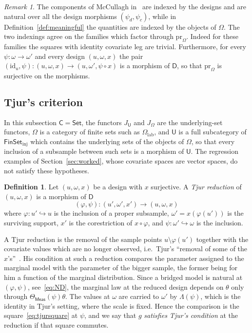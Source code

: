 \documentclass[11pt,a4paper]{article}
\theoremstyle{plain}
\theoremstyle{definition}
\newtheorem{definition}[theorem]{Definition}
\theoremstyle{remark}
\newtheorem{remark}[theorem]{Remark}
\newcommand{\cat}[1]{\mathsf{#1}}
\newcommand{\catU}{\cat{U}}
\newcommand{\catO}{\cat{\Omega}}
\newcommand{\catD}{\cat{D}}
\newcommand{\Meas}{\cat{Meas}}
\newcommand{\Set}{\cat{Set}}
\newcommand{\FinSet}{\cat{FinSet}}
\newcommand{\id}{\mathrm{id}}
\newcommand{\pr}{\mathrm{pr}}
\begin{document}
\begin{remark}\label{rem:indexings}
The components of McCullagh in~\cite[\S4.5]{mccullagh_what_2002} are indexed
by the designs and are natural over all the design morphisms
$(\psi_{d},\psi_{c})$, while in Definition~\ref{def:meaningful} the quantities
are indexed by the objects of $\catO$. The two indexings agree on the families
which factor through $\pr_{\catO}$. Indeed for these families the squares with
identity covariate leg are trivial. Furthermore, for every
$\psi \colon \omega \to \omega'$ and every design $(u,\omega,x)$ the pair
$(\id_{u},\psi) \colon (u,\omega,x) \to (u,\omega',\psi\circ x)$ is a morphism
of $\catD$, so that $\pr_{\catO}$ is surjective on the morphisms.
\end{remark}

\subsection{Tjur's criterion}\label{sec:tjur}

In this subsection $\cat{C} = \Set$, the functors $J_{\catU}$ and $J_{\catO}$
are the underlying-set functors, $\catO$ is a category of finite sets such as
$\catO_{\mathrm{lab}}$, and $\catU$ is a full subcategory of
$\FinSet_{\mathrm{inj}}$ which contains the underlying sets of the objects of
$\catO$, so that every inclusion of a subsample between such sets is a
morphism of $\catU$. The regression examples of Section~\ref{sec:worked},
whose covariate spaces are vector spaces, do not satisfy these hypotheses.

\begin{definition}\label{def:tjurreduction}
Let $(u,\omega,x)$ be a design with $x$ surjective. A \emph{Tjur reduction} of
$(u,\omega,x)$ is a morphism of $\catD$
\[
(\varphi,\psi) \colon (u',\omega',x') \longrightarrow (u,\omega,x)
\]
where $\varphi \colon u' \hookrightarrow u$ is the inclusion of a proper
subsample, $\omega' = x(\varphi(u'))$ is the surviving support, $x'$ is the
corestriction of $x \circ \varphi$, and
$\psi \colon \omega' \hookrightarrow \omega$ is the inclusion.
\end{definition}

A Tjur reduction is the removal of the sample points
$u \setminus \varphi(u')$ together with the covariate values which are no
longer observed, i.e.\ Tjur's ``removal of some of the
$x$'s''~\cite[p.~1299]{tjur_discussion_2002}. His condition at such a
reduction compares the parameter assigned to the marginal model with the
parameter of the bigger sample, the former being for him a function of the
marginal distribution. Since a bridged model is natural at $(\varphi,\psi)$,
see~\eqref{eq:ND}, the marginal law at the reduced design depends on $\theta$
only through $\Theta_\Meas(\psi)\theta$. The values at $\omega$ are carried to
$\omega'$ by $\Lambda(\psi)$, which is the identity in Tjur's setting, where
the scale is fixed. Hence the comparison is the square~\eqref{eq:tjursquare}
at $\psi$, and we say that $g$ \emph{satisfies Tjur's condition} at the
reduction if that square commutes.
\end{document}
